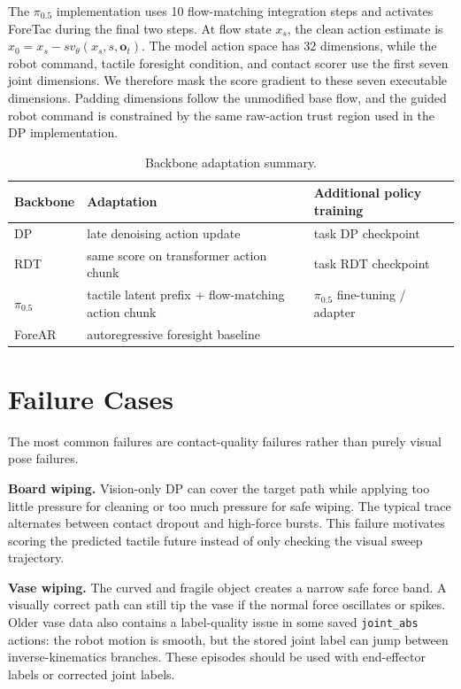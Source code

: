 \documentclass[10pt,letterpaper]{article}
\newcommand{\obs}{\mathbf{o}}
\newcommand{\tabstyle}{\small\setlength{\tabcolsep}{3pt}\renewcommand{\arraystretch}{1.15}}
\begin{document}
The $\pi_{0.5}$ implementation uses 10 flow-matching integration steps and
activates ForeTac during the final two steps. At flow state $x_s$, the clean
action estimate is $\hat{x}_0=x_s-sv_\theta(x_s,s,\obs_t)$. The model action
space has 32 dimensions, while the robot command, tactile foresight condition,
and contact scorer use the first seven joint dimensions. We therefore mask the
score gradient to these seven executable dimensions. Padding dimensions follow
the unmodified base flow, and the guided robot command is constrained by the
same raw-action trust region used in the DP implementation.

\begin{table}[H]
\caption{Backbone adaptation summary.}
\label{tab:backbone_adapt}
\centering
\tabstyle
\begin{tabular}{p{}p{}p{}}
\toprule
Backbone & Adaptation & Additional policy training\\
\midrule
DP & late denoising action update & task DP checkpoint\\
RDT & same score on transformer action chunk & task RDT checkpoint\\
$\pi_{0.5}$ & tactile latent prefix + flow-matching action chunk & $\pi_{0.5}$ fine-tuning / adapter\\
ForeAR & autoregressive foresight baseline & \\
\bottomrule
\end{tabular}
\end{table}

\section{Failure Cases}
\label{sec:failures}

The most common failures are contact-quality failures rather than purely visual
pose failures.

\textbf{Board wiping.} Vision-only DP can cover the target path while applying
too little pressure for cleaning or too much pressure for safe wiping. The
typical trace alternates between contact dropout and high-force bursts. This
failure motivates scoring the predicted tactile future instead of only checking
the visual sweep trajectory.

\textbf{Vase wiping.} The curved and fragile object creates a narrow safe
force band. A visually correct path can still tip the vase if the normal force
oscillates or spikes. Older vase data also contains a label-quality issue in
some saved \texttt{joint\_abs} actions: the robot motion is smooth, but the
stored joint label can jump between inverse-kinematics branches. These episodes
should be used with end-effector labels or corrected joint labels.
\end{document}
